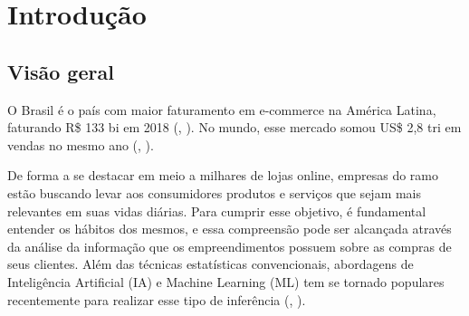 










\textual

\chapter{Introdução}
\pagestyle{simple} 

\section{Visão geral}
O Brasil é o país com maior faturamento em e-commerce na América Latina, faturando R\$ 133 bi em 2018 (\citeauthor{ebit19}, \citeyear{ebit19}). No mundo, esse mercado somou US\$ 2,8 tri em vendas no mesmo ano (\citeauthor{shopify19}, \citeyear{shopify19}).

De forma a se destacar em meio a milhares de lojas online, empresas do ramo estão buscando levar aos consumidores produtos e serviços que sejam mais relevantes em suas vidas diárias. Para cumprir esse objetivo, é fundamental entender os hábitos dos mesmos, e essa compreensão pode ser alcançada através da análise da informação que os empreendimentos possuem sobre as compras de seus clientes. Além das técnicas estatísticas convencionais, abordagens de Inteligência Artificial (IA) e Machine Learning (ML) tem se tornado populares recentemente para realizar esse tipo de inferência (\citeauthor{rheude19}, \citeyear{rheude19}).

